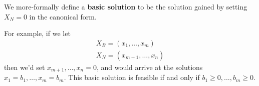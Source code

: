 We more-formally define a \textbf{basic solution} to be the solution gained by
setting $X_N=0$ in the canonical form.

For example, if we let
\begin{align*}
    X_B = (x_1,\ldots,x_m)\\
    X_N = (x_{m+1},\ldots,x_n)
\end{align*}
then we'd set $x_{m+1},\ldots,x_n = 0$, and would arrive at the solutions
$x_1=b_1,\ldots,x_m=b_m$. This basic solution is feasible if and only if $b_1
\geq 0,\ldots,b_m \geq 0$.
